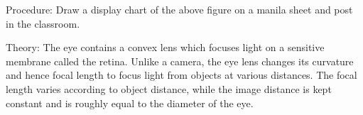 \begin{multicols}{2}
\begin{description*}
\item[Procedure:]{Draw a display chart of the above figure on a manila sheet and post in the classroom.}
\item[Theory:]{The eye contains a convex lens which focuses light on a sensitive membrane called the retina. Unlike a camera, the eye lens changes its curvature and hence focal length to focus light from objects at various distances. The focal length varies according to object distance, while the image distance is kept constant and is roughly equal to the diameter of the eye.}
\end{description*}



\end{multicols}

\pagebreak